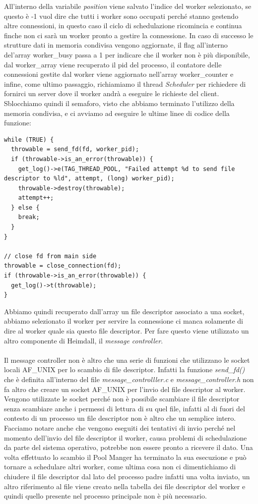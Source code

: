 \documentclass[italian]{tktltiki2}
\begin{document}
All'interno della variabile \emph{position} viene salvato l'indice del worker selezionato, se questo è -1 vuol dire che tutti i worker sono occupati perché stanno gestendo altre connessioni, in questo caso il ciclo di schedulazione ricomincia e continua finche non ci sarà un worker pronto a gestire la connessione. In caso di successo le strutture dati in memoria condivisa vengono aggiornate, il flag all'interno del'array worker\_busy passa a 1 per indicare che il worker non è più disponibile, dal worker\_array viene recuperato il pid del processo, il contatore delle connessioni gestite dal worker viene aggiornato nell'array worker\_counter e infine, come ultimo passaggio, richiamiamo il thread \emph{Scheduler} per richiedere di fornirci un server dove il worker andrà a eseguire le richieste del client. Sblocchiamo quindi il semaforo, visto che abbiamo terminato l'utilizzo della memoria condivisa, e ci avviamo ad eseguire le ultime linee di codice della funzione:

\begin{lstlisting}
while (TRUE) {
  throwable = send_fd(fd, worker_pid);
  if (throwable->is_an_error(throwable)) {
    get_log()->e(TAG_THREAD_POOL, "Failed attempt %d to send file descriptor to %ld", attempt, (long) worker_pid);
    throwable->destroy(throwable);
    attempt++;
  } else {
    break;
  }
}

// close fd from main side
throwable = close_connection(fd);
if (throwable->is_an_error(throwable)) {
  get_log()->t(throwable);
}
\end{lstlisting}
Abbiamo quindi recuperato dall'array un file descriptor associato a una socket, abbiamo selezionato il worker per servire la connessione ci manca solamente di dire al worker quale sia questo file descriptor. Per fare questo viene utilizzato un altro componente di Heimdall, il \emph{message controller}.\\\\ Il message controller non è altro che una serie di funzioni che utilizzano le socket locali AF\_UNIX per lo scambio di file descriptor. Infatti la funzione \emph{send\_fd()} che è definita all'interno del file \emph{message\_controlller.c} e \emph{message\_controller.h} non fa altro che creare un socket AF\_UNIX per l'invio del file descriptor al worker. Vengono utilizzate le socket perché non è possibile scambiare il file descriptor senza scambiare anche i permessi di lettura di su quel file, infatti al di fuori del contesto di un processo un file descriptor non è altro che un semplice intero. Facciamo notare anche che vengono eseguiti dei tentativi di invio perché nel momento dell'invio del file descriptor il worker, causa problemi di schedulazione da parte del sistema operativo, potrebbe non essere pronto a ricevere il dato. Una volta effettuato lo scambio il Pool Manger ha terminato la sua esecuzione e può tornare a schedulare altri worker, come ultima cosa non ci dimentichiamo di chiudere il file descriptor dal lato del processo padre infatti una volta inviato, un altro riferimento al file viene creato nella tabella dei file descriptor del worker e quindi quello presente nel processo principale non è più necessario.
\end{document}
